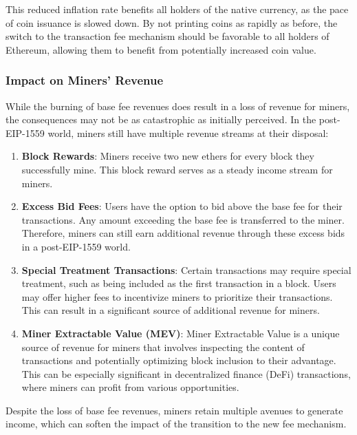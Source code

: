 This reduced inflation rate benefits all holders of the native currency, as the pace of coin issuance is slowed down. By not printing coins as rapidly as before, the switch to the transaction fee mechanism should be favorable to all holders of Ethereum, allowing them to benefit from potentially increased coin value.

\subsubsection{Impact on Miners' Revenue}
While the burning of base fee revenues does result in a loss of revenue for miners, the consequences may not be as catastrophic as initially perceived. In the post-EIP-1559 world, miners still have multiple revenue streams at their disposal:

\begin{enumerate}
    \item \textbf{Block Rewards}: Miners receive two new ethers for every block they successfully mine. This block reward serves as a steady income stream for miners.
    
    \item \textbf{Excess Bid Fees}: Users have the option to bid above the base fee for their transactions. Any amount exceeding the base fee is transferred to the miner. Therefore, miners can still earn additional revenue through these excess bids in a post-EIP-1559 world.
    
    \item \textbf{Special Treatment Transactions}: Certain transactions may require special treatment, such as being included as the first transaction in a block. Users may offer higher fees to incentivize miners to prioritize their transactions. This can result in a significant source of additional revenue for miners.

    \item \textbf{Miner Extractable Value (MEV)}: Miner Extractable Value is a unique source of revenue for miners that involves inspecting the content of transactions and potentially optimizing block inclusion to their advantage. This can be especially significant in decentralized finance (DeFi) transactions, where miners can profit from various opportunities.
\end{enumerate}
Despite the loss of base fee revenues, miners retain multiple avenues to generate income, which can soften the impact of the transition to the new fee mechanism.\\

